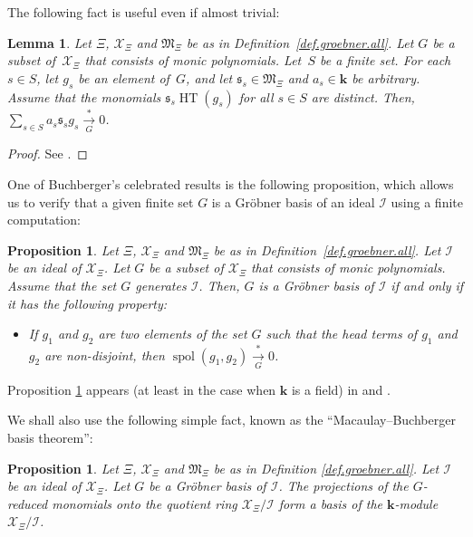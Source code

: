 \documentclass[pdftex]{sigma}
\newtheorem{Lemma}[Theorem]{Lemma}
\newtheorem{Proposition}[Theorem]{Proposition}
\numberwithin{equation}{section}
\let\sumnonlimits\sum
\renewcommand{\sum}{\sumnonlimits\limits}
\begin{document}
The following fact is useful even if almost trivial:

\begin{Lemma}\label{lem.groebner.to0}Let $\Xi$, $\mathcal{X}_{\Xi}$ and $\mathfrak{M}_{\Xi}$ be as in Definition~{\rm \ref{def.groebner.all}}. Let $G$ be a subset of~$\mathcal{X}_{\Xi}$ that consists of monic polynomials. Let~$S$ be a finite set. For each $s\in S$, let $g_{s}$ be an element of~$G$, and let $\mathfrak{s}_{s}\in\mathfrak{M}_{\Xi}$ and $a_{s}\in\mathbf{k}$ be arbitrary. Assume that the monomials $\mathfrak{s}_{s}\operatorname*{HT}(g_{s}) $ for all $s\in S$ are distinct. Then, $\sum_{s\in S}a_{s}\mathfrak{s}_{s}g_{s}\overset{\ast}{\underset{G}{\longrightarrow}}0$.
\end{Lemma}

\begin{proof}See \cite{verlong}.
\end{proof}

One of Buchberger's celebrated results is the following proposition, which allows us to verify that a given finite set $G$ is a Gr\"{o}bner basis of an ideal $\mathcal{I}$ using a finite computation:

\begin{Proposition}\label{prop.groebner.buch1}Let $\Xi$, $\mathcal{X}_{\Xi}$ and $\mathfrak{M}_{\Xi}$ be as in Definition~{\rm \ref{def.groebner.all}}. Let $\mathcal{I}$ be an ideal of $\mathcal{X}_{\Xi}$. Let $G$ be a subset of $\mathcal{X}_{\Xi}$ that consists of monic polynomials. Assume that the set $G$ generates $\mathcal{I}$. Then, $G$ is a Gr\"{o}bner basis of $\mathcal{I}$ if and only if it has the following property:
\begin{itemize}\itemsep=0pt
\item If $g_{1}$ and $g_{2}$ are two elements of the set $G$ such that the head terms of $g_{1}$ and $g_{2}$ are non-disjoint, then $\operatorname*{spol} ( g_{1},g_{2}) \overset{\ast}{\underset{G}{\longrightarrow}}0$.
\end{itemize}
\end{Proposition}

Proposition \ref{prop.groebner.buch1} appears (at least in the case when $\mathbf{k}$ is a field) in \cite[Theorem~5.68, (ii)~$\Longleftrightarrow$~(i)]{BecWei98} and \cite[conclusion after the proof of Lemma~1.1.38]{Graaf16}.

We shall also use the following simple fact, known as the ``Macaulay--Buchberger basis theorem'':

\begin{Proposition}\label{prop.groebner.standardbasis}Let $\Xi$, $\mathcal{X}_{\Xi}$ and $\mathfrak{M}_{\Xi}$ be as in Definition \ref{def.groebner.all}. Let $\mathcal{I}$ be an ideal of $\mathcal{X}_{\Xi}$. Let $G$ be a Gr\"{o}bner basis of $\mathcal{I}$. The projections of the $G$-reduced monomials onto the quotient ring $\mathcal{X}_{\Xi}/\mathcal{I}$ form a basis of the $\mathbf{k} $-module $\mathcal{X}_{\Xi}/\mathcal{I}$.
\end{Proposition}
\end{document}
